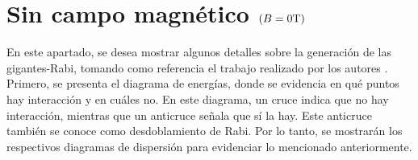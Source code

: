 \documentclass[main.tex]{subfiles}
\begin{document}
\section{Sin campo magn\'etico $(B=0 \text{\normalfont T})$}

En este apartado, se desea mostrar algunos detalles sobre la generación de las gigantes-Rabi, tomando como referencia el trabajo realizado por los autores \textcite{Vargas2022}. Primero, se presenta el diagrama de energías, donde se evidencia en qué puntos hay interacción y en cuáles no. En este diagrama, un cruce indica que no hay interacción, mientras que un anticruce señala que sí la hay. Este anticruce también se conoce como desdoblamiento de Rabi. Por lo tanto, se mostrarán los respectivos diagramas de dispersión para evidenciar lo mencionado anteriormente.
\end{document}
